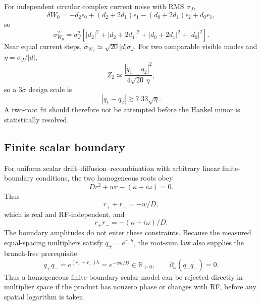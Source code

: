 \documentclass[11pt]{article}
\begin{document}
For independent circular complex current noise with RMS $\sigma_J$,
\begin{equation}
\delta W_0
=-d_2\epsilon_0+(d_2+2d_1)\epsilon_1
-(d_0+2d_1)\epsilon_2+d_0\epsilon_3,
\end{equation}
so
\begin{equation}
\boxed{
\sigma_{W_0}^2=\sigma_J^2\left[
|d_2|^2+|d_2+2d_1|^2+|d_0+2d_1|^2+|d_0|^2
\right].}
\label{eq:Wnoise}
\end{equation}
Near equal current steps, $\sigma_{W_0}\simeq\sqrt{20}|d|\sigma_J$. For two comparable visible modes and $\eta=\sigma_J/|d|$,
\begin{equation}
Z_2\simeq\frac{|q_1-q_2|^2}{4\sqrt{20}\,\eta},
\end{equation}
so a $3\sigma$ design scale is
\begin{equation}
\boxed{|q_1-q_2|\gtrsim7.33\sqrt{\eta}.}
\label{eq:twores}
\end{equation}
A two-root fit should therefore not be attempted before the Hankel minor is statistically resolved.

\subsection{Finite scalar boundary}

For uniform scalar drift--diffusion--recombination with arbitrary linear finite-boundary conditions, the two homogeneous roots obey
\begin{equation}
D r^2+w r-(\kappa+i\omega)=0.
\end{equation}
Thus
\begin{equation}
\boxed{r_++r_-=-w/D,}
\label{eq:rootsum}
\end{equation}
which is real and RF-independent, and
\begin{equation}
\boxed{r_+r_-=-(\kappa+i\omega)/D.}
\label{eq:rootprod}
\end{equation}
The boundary amplitudes do not enter these constraints. Because the measured equal-spacing multipliers satisfy $q_\pm=e^{r_\pm h}$, the root-sum law also supplies the branch-free prerequisite
\begin{equation}
\boxed{q_+q_-=e^{(r_++r_-)h}=e^{-wh/D}\in\mathbb{R}_{>0},\qquad \partial_\omega(q_+q_-)=0.}
\label{eq:multiplier_product_boundary}
\end{equation}
Thus a homogeneous finite-boundary scalar model can be rejected directly in multiplier space if the product has nonzero phase or changes with RF, before any spatial logarithm is taken.
\end{document}
